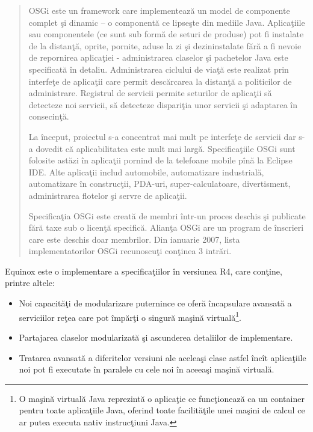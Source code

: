 \begin{quotation}
OSGi este un framework care implementează un model de componente complet şi 
dinamic -- o componentă ce lipseşte din mediile Java. Aplicaţiile sau 
componentele (ce sunt sub formă de seturi de produse) pot fi instalate de la 
distanţă, oprite, pornite, aduse la zi şi dezininstalate fără a fi nevoie de 
repornirea aplicaţiei - administrarea claselor şi pachetelor Java este 
specificată în detaliu. Administrarea ciclului de viaţă este realizat prin 
interfeţe de aplicaţii care permit descărcarea la distanţă a politicilor de 
administrare. Registrul de servicii permite seturilor de aplicaţii să detecteze 
noi servicii, să detecteze dispariţia unor servicii şi adaptarea în consecinţă.

La început, proiectul s-a concentrat mai mult pe interfeţe de servicii dar s-a 
dovedit că aplicabilitatea este mult mai largă. Specificaţiile OSGi sunt 
folosite astăzi în aplicaţii pornind de la telefoane mobile pînă la Eclipse 
IDE. Alte aplicaţii includ automobile, automatizare industrială, automatizare 
în construcţii, PDA-uri, super-calculatoare, divertisment, administrarea 
flotelor şi servre de aplicaţii.

Specificaţia OSGi este creată de membri într-un proces deschis şi publicate 
fără taxe sub o licenţă specifică. Alianţa OSGi are un program de înscrieri 
care este deschis doar membrilor. Din ianuarie 2007, lista implementatorilor 
OSGi recunoscuţi conţinea 3 intrări.
\cite{osgiwiki}
\end{quotation}

Equinox este o implementare a specificaţiilor în versiunea 
R4, care conţine, printre altele\cite{osgiwiki}:

\begin{itemize}
  \item Noi capacităţi de modularizare puternince ce oferă încapsulare avansată 
  a serviciilor reţea care pot împărţi o singură maşină virtuală\footnote{O 
  maşină virtuală Java reprezintă o aplicaţie ce funcţionează ca un container 
  pentru toate aplicaţiile Java, oferind toate facilităţile unei maşini de 
  calcul ce ar putea executa nativ instrucţiuni Java.}.
  \item Partajarea claselor modularizată şi ascunderea detaliilor de 
  implementare.
  \item Tratarea avansată a diferitelor versiuni ale aceleaşi clase astfel 
  încît aplicaţiile noi pot fi executate în paralele cu cele noi în aceeaşi 
  maşină virtuală.
\end{itemize}

